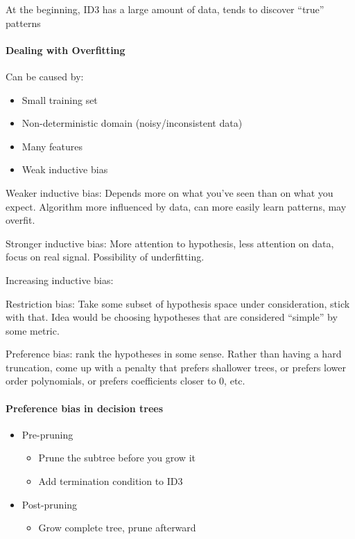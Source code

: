 At the beginning, ID3 has a large amount of data, tends to discover ``true'' patterns

\paragraph{Dealing with Overfitting} Can be caused by:
\begin{itemize}
  \item Small training set
  \item Non-deterministic domain (noisy/inconsistent data)
  \item Many features
  \item Weak inductive bias
\end{itemize}

Weaker inductive bias: Depends more on what you've seen than on what you expect. Algorithm more influenced by data, can more easily learn patterns, may overfit.

Stronger inductive bias: More attention to hypothesis, less attention on data, focus on real signal. Possibility of underfitting.

Increasing inductive bias:

Restriction bias: Take some subset of hypothesis space under consideration, stick with that. Idea would be choosing hypotheses that are considered ``simple'' by some metric.

Preference bias: rank the hypotheses in some sense. Rather than having a hard truncation, come up with a penalty that prefers shallower trees, or prefers lower order polynomials, or prefers coefficients closer to 0, etc.

\paragraph{Preference bias in decision trees} 
\begin{itemize}
  \item Pre-pruning
  \begin{itemize}
    \item Prune the subtree before you grow it
    \item Add termination condition to ID3
  \end{itemize}
  \item Post-pruning
  \begin{itemize}
    \item Grow complete tree, prune afterward
  \end{itemize}
\end{itemize}

